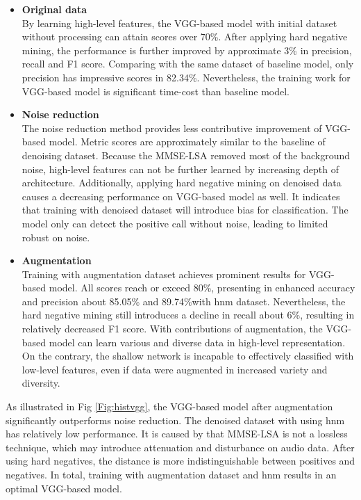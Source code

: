 \begin{itemize}[leftmargin=*]
    \item \textbf{Original data}\\
     By learning high-level features, the VGG-based model with initial dataset without processing can attain scores over 70\%. After applying hard negative mining, the performance is further improved by approximate 3\% in precision, recall and F1 score. Comparing with the same dataset of baseline model, only precision has impressive scores in 82.34\%. Nevertheless, the training work for VGG-based model is significant time-cost than baseline model.
    \item \textbf{Noise reduction}\\
    The noise reduction method provides less contributive improvement of VGG-based model. Metric scores are approximately similar to the baseline of denoising dataset. Because the MMSE-LSA removed most of the background noise, high-level features can not be further learned by increasing depth of architecture. Additionally, applying hard negative mining on denoised data causes a decreasing performance on VGG-based model as well. It indicates that training with denoised dataset will introduce bias for classification. The model only can detect the positive call without noise, leading to limited robust on noise.
    \item \textbf{Augmentation}\\
    Training with augmentation dataset achieves prominent results for VGG-based model. All scores reach or exceed 80\%, presenting in enhanced accuracy and precision about 85.05\% and 89.74\%with hnm dataset. Nevertheless, the hard negative mining still introduces a decline in recall about 6\%, resulting in relatively decreased F1 score. With contributions of augmentation, the VGG-based model can learn various and diverse data in high-level representation. On the contrary, the shallow network is incapable to effectively classified with low-level features, even if data were augmented in increased variety and diversity.
\end{itemize}
As illustrated in Fig \ref{Fig:histvgg}, the VGG-based model after augmentation significantly outperforms noise reduction. The denoised dataset with using hnm has relatively low performance. It is caused by that MMSE-LSA is not a lossless technique, which may introduce attenuation and disturbance on audio data. After using hard negatives, the distance is more indistinguishable between positives and negatives. In total, training with augmentation dataset and hnm results in an optimal VGG-based model.
